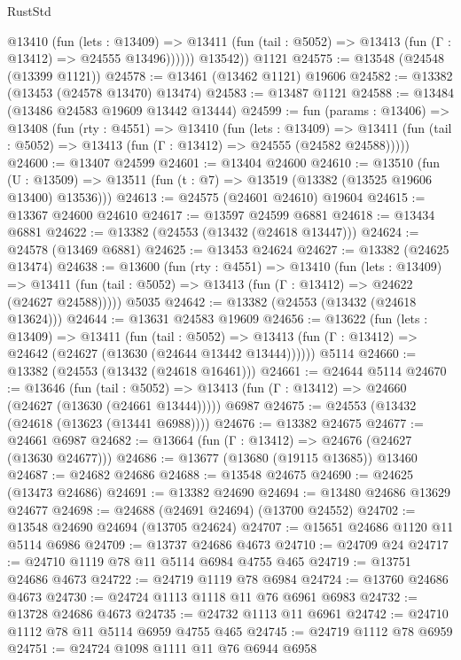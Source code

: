 \begin{lexlean}{RustStd}
\begin{coremodule}
            @13410
              (fun (lets : @13409) =>
              @13411 (fun (tail : @5052) => @13413 (fun (Γ : @13412) => @24555 @13496))))))
        @13542))
    @1121
@24575 := @13548 (@24548 (@13399 @1121))
@24578 := @13461 (@13462 @1121) @19606
@24582 := @13382 (@13453 (@24578 @13470) @13474)
@24583 := @13487 @1121
@24588 := @13484 (@13486 @24583 @19609 @13442 @13444)
@24599 := fun (params : @13406) =>
  @13408
    (fun (rty : @4551) =>
    @13410
      (fun (lets : @13409) =>
      @13411 (fun (tail : @5052) => @13413 (fun (Γ : @13412) => @24555 (@24582 @24588)))))
@24600 := @13407 @24599
@24601 := @13404 @24600
@24610 := @13510
    (fun (U : @13509) => @13511 (fun (t : @7) => @13519 (@13382 (@13525 @19606 @13400) @13536)))
@24613 := @24575 (@24601 @24610) @19604
@24615 := @13367 @24600 @24610
@24617 := @13597 @24599 @6881
@24618 := @13434 @6881
@24622 := @13382 (@24553 (@13432 (@24618 @13447)))
@24624 := @24578 (@13469 @6881)
@24625 := @13453 @24624
@24627 := @13382 (@24625 @13474)
@24638 := @13600
    (fun (rty : @4551) =>
    @13410
      (fun (lets : @13409) =>
      @13411 (fun (tail : @5052) => @13413 (fun (Γ : @13412) => @24622 (@24627 @24588)))))
    @5035
@24642 := @13382 (@24553 (@13432 (@24618 @13624)))
@24644 := @13631 @24583 @19609
@24656 := @13622
    (fun (lets : @13409) =>
    @13411
      (fun (tail : @5052) =>
      @13413 (fun (Γ : @13412) => @24642 (@24627 (@13630 (@24644 @13442 @13444))))))
    @5114
@24660 := @13382 (@24553 (@13432 (@24618 @16461)))
@24661 := @24644 @5114
@24670 := @13646
    (fun (tail : @5052) => @13413 (fun (Γ : @13412) => @24660 (@24627 (@13630 (@24661 @13444)))))
    @6987
@24675 := @24553 (@13432 (@24618 (@13623 (@13441 @6988))))
@24676 := @13382 @24675
@24677 := @24661 @6987
@24682 := @13664 (fun (Γ : @13412) => @24676 (@24627 (@13630 @24677)))
@24686 := @13677 (@13680 (@19115 @13685)) @13460
@24687 := @24682 @24686
@24688 := @13548 @24675
@24690 := @24625 (@13473 @24686)
@24691 := @13382 @24690
@24694 := @13480 @24686 @13629 @24677
@24698 := @24688 (@24691 @24694) (@13700 @24552)
@24702 := @13548 @24690 @24694 (@13705 @24624)
@24707 := @15651 @24686 @1120 @11 @5114 @6986
@24709 := @13737 @24686 @4673
@24710 := @24709 @24
@24717 := @24710 @1119 @78 @11 @5114 @6984 @4755 @465
@24719 := @13751 @24686 @4673
@24722 := @24719 @1119 @78 @6984
@24724 := @13760 @24686 @4673
@24730 := @24724 @1113 @1118 @11 @76 @6961 @6983
@24732 := @13728 @24686 @4673
@24735 := @24732 @1113 @11 @6961
@24742 := @24710 @1112 @78 @11 @5114 @6959 @4755 @465
@24745 := @24719 @1112 @78 @6959
@24751 := @24724 @1098 @1111 @11 @76 @6944 @6958

\end{coremodule}
\end{lexlean}

